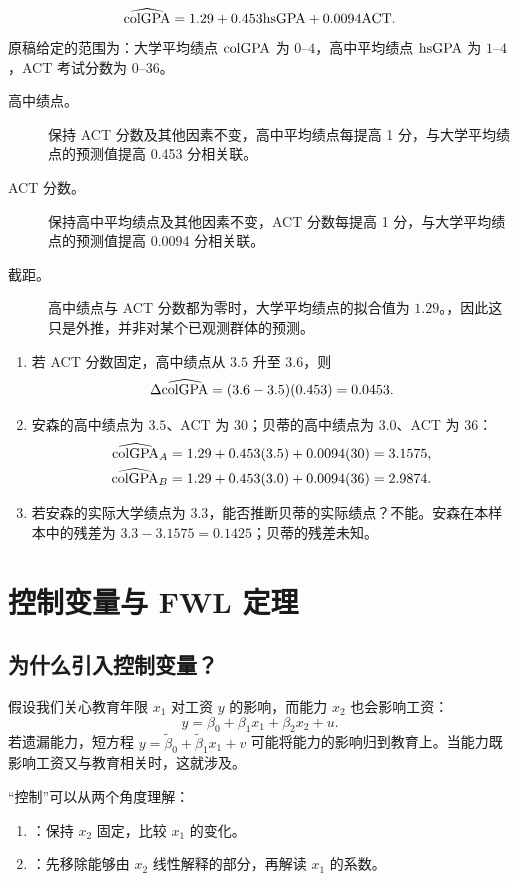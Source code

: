 \begin{example}[大学平均绩点]\label{ex:gpa}
\[\widehat{\mathrm{colGPA}}=1.29+0.453\mathrm{hsGPA}+0.0094\mathrm{ACT}.\]
原稿给定的范围为：大学平均绩点 $\mathrm{colGPA}$ 为 $0$--$4$，高中平均绩点 $\mathrm{hsGPA}$ 为 $1$--$4$，ACT 考试分数为 $0$--$36$。
\begin{description}
\item[高中绩点。]保持 ACT 分数及其他因素不变，高中平均绩点每提高 1 分，与大学平均绩点的预测值提高 0.453 分相关联。
\item[ACT 分数。]保持高中平均绩点及其他因素不变，ACT 分数每提高 1 分，与大学平均绩点的预测值提高 0.0094 分相关联。
\item[截距。]高中绩点与 ACT 分数都为零时，大学平均绩点的拟合值为 $1.29$。，因此这只是外推，并非对某个已观测群体的预测。
\end{description}
\begin{enumerate}
\item 若 ACT 分数固定，高中绩点从 $3.5$ 升至 $3.6$，则
\[\Delta\widehat{\mathrm{colGPA}}=(3.6-3.5)(0.453)=0.0453.\]
\item 安森的高中绩点为 $3.5$、ACT 为 $30$；贝蒂的高中绩点为 $3.0$、ACT 为 $36$：
\begin{align*}
\widehat{\mathrm{colGPA}}_{A}&=1.29+0.453(3.5)+0.0094(30)=3.1575,\\
\widehat{\mathrm{colGPA}}_{B}&=1.29+0.453(3.0)+0.0094(36)=2.9874.
\end{align*}
\item 若安森的实际大学绩点为 $3.3$，能否推断贝蒂的实际绩点？不能。安森在本样本中的残差为 $3.3-3.1575=0.1425$；贝蒂的残差未知。
\end{enumerate}
\end{example}


\section{控制变量与 FWL 定理}
\label{sec:fwl-week2}
\subsection{为什么引入控制变量？}
假设我们关心教育年限 $x_1$ 对工资 $y$ 的影响，而能力 $x_2$ 也会影响工资：
\[y=\beta_0+\beta_1x_1+\beta_2x_2+u.\]
若遗漏能力，短方程 $y=\tilde\beta_0+\tilde\beta_1x_1+v$ 可能将能力的影响归到教育上。当能力既影响工资又与教育相关时，这就涉及。

“控制”可以从两个角度理解：
\begin{enumerate}
\item {}：保持 $x_2$ 固定，比较 $x_1$ 的变化。
\item {}：先移除能够由 $x_2$ 线性解释的部分，再解读 $x_1$ 的系数。
\end{enumerate}

